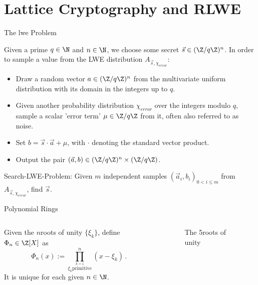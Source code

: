 \section{Lattice Cryptography and RLWE}
\begin{frame}{The \gls{lwe} Problem}
  \begin{definition}
    Given a prime $q \in \N$ and $n \in \N$, we choose some secret $\vec{s} \in (\Z / q \Z)^n$.
    In order to sample a value from the LWE distribution $A_{\vec{s}, \chi_{error}}$:
    \begin{itemize}
      \item Draw a random vector $a \in (\Z/q\Z)^n$ from the multivariate uniform distribution with its domain in the integers up to $q$.
      \item Given another probability distribution $\chi_{error}$ over the integers modulo $q$, sample a scalar 'error term' $\mu \in \Z / q \Z$ from it, often also referred to as noise.
      \item Set $b = \vec{s} \cdot \vec{a} + \mu$, with $\cdot$ denoting the standard vector product.
      \item Output the pair $(\vec{a}, b) \in (\Z / q \Z)^n \times (\Z / q \Z)$.
    \end{itemize}
  \end{definition}

  Search-LWE-Problem:
  Given $m$ independent samples $(\vec{a}_i, b_i)_{0 < i \leq m}$ from $A_{\vec{s}, \chi_{error}}$, find $\vec{s}$.
\end{frame}

\begin{frame}{Polynomial Rings}
  \begin{columns}
    \begin{column}{0.5\linewidth}
      \begin{definition}
        Given the $n$\th roots of unity $\{\xi_k\}$, define $\Phi_n \in \Z[X]$ as
        $$\Phi_n(x) := \prod_{\stackrel{k=1}{\xi_k \mathrm{primitive}}}^{n} (x - \xi_k) \,.$$
        It is unique for each given $n \in \N$.
      \end{definition}
    \end{column}
    \begin{column}{0.32\linewidth}
      \begin{figure}
        \caption{The 5\th roots of unity}
        \label{fig:nth-roots-of-unity}
      \end{figure}
    \end{column}
  \end{columns}
\end{frame}

